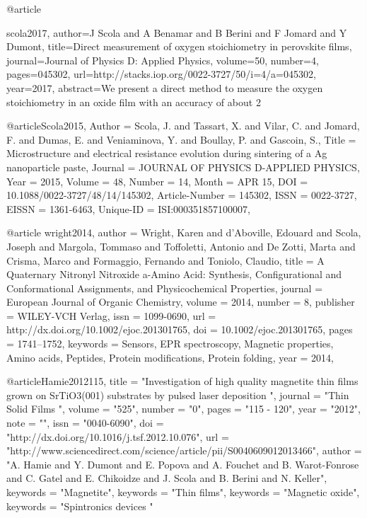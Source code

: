 @article{scola2017,
  author={J Scola and A Benamar and B Berini and F Jomard and Y Dumont},
  title={Direct measurement of oxygen stoichiometry in perovskite films},
  journal={Journal of Physics D: Applied Physics},
  volume={50},
  number={4},
  pages={045302},
  url={http://stacks.iop.org/0022-3727/50/i=4/a=045302},
  year={2017},
  abstract={We present a direct method to measure the oxygen stoichiometry in an oxide film with an accuracy of about 2%
}

@article{Scola2015,
Author = {Scola, J. and Tassart, X. and Vilar, C. and Jomard, F. and Dumas, E. and
   Veniaminova, Y. and Boullay, P. and Gascoin, S.},
Title = {{Microstructure and electrical resistance evolution during sintering of a
   Ag nanoparticle paste}},
Journal = {{JOURNAL OF PHYSICS D-APPLIED PHYSICS}},
Year = {{2015}},
Volume = {{48}},
Number = {{14}},
Month = {{APR 15}},
DOI = {{10.1088/0022-3727/48/14/145302}},
Article-Number = {{145302}},
ISSN = {{0022-3727}},
EISSN = {{1361-6463}},
Unique-ID = {{ISI:000351857100007}},
}

@article {wright2014,
author = {Wright, Karen and d'Aboville, Edouard and Scola, Joseph and Margola, Tommaso and Toffoletti, Antonio and De Zotti, Marta and Crisma, Marco and Formaggio, Fernando and Toniolo, Claudio},
title = {A Quaternary Nitronyl Nitroxide a-Amino Acid: Synthesis, Configurational and Conformational Assignments, and Physicochemical Properties},
journal = {European Journal of Organic Chemistry},
volume = {2014},
number = {8},
publisher = {WILEY-VCH Verlag},
issn = {1099-0690},
url = {http://dx.doi.org/10.1002/ejoc.201301765},
doi = {10.1002/ejoc.201301765},
pages = {1741--1752},
keywords = {Sensors, EPR spectroscopy, Magnetic properties, Amino acids, Peptides­, Protein modifications, Protein folding},
year = {2014},
}

@article{Hamie2012115,
title = "Investigation of high quality magnetite thin films grown on SrTiO3(001) substrates by pulsed laser deposition ",
journal = "Thin Solid Films ",
volume = "525",
number = "0",
pages = "115 - 120",
year = "2012",
note = "",
issn = "0040-6090",
doi = "http://dx.doi.org/10.1016/j.tsf.2012.10.076",
url = "http://www.sciencedirect.com/science/article/pii/S0040609012013466",
author = "A. Hamie and Y. Dumont and E. Popova and A. Fouchet and B. Warot-Fonrose and C. Gatel and E. Chikoidze and J. Scola and B. Berini and N. Keller",
keywords = "Magnetite",
keywords = "Thin films",
keywords = "Magnetic oxide",
keywords = "Spintronics devices "
}

}
